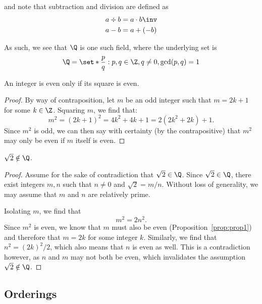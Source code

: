 \documentclass{article}
\begin{document}
and note that subtraction and division are defined as
\begin{align*}
  a \div b &= a \cdot b\inv\\
  a - b &= a + (-b)
\end{align*}

As such, we see that $\Q$ is one such field, where the underlying
set is
\begin{equation}
  \Q = \set*{\dfrac{p}{q} : p, q \in \Z, q \ne 0, \gcd(p, q) = 1}
\end{equation}

\begin{prop}\label{prop:prop1}
 An integer is even only if its square is even.
\end{prop}
\begin{proof}
  By way of contraposition, let $m$ be an odd integer such that
  $m = 2k+1$ for some $k \in \Z$. Squaring $m$, we find that:
  \begin{equation}
    m^{2} = {(2k + 1)}^{2} = 4k^{2} + 4k + 1 = 2(2k^{2} + 2k) + 1.
  \end{equation}
  Since $m^{2}$ is odd, we can then say with certainty (by the contrapositive)
  that $m^{2}$ may only be even if $m$ itself is even.
\end{proof}

\begin{theorem}
  $\sqrt{2} \notin \Q$.
\end{theorem}
\begin{proof}
  Assume for the sake of contradiction that $\sqrt{2} \in \Q$.
  Since $\sqrt{2} \in \Q$, there exist integers $m, n$ such that $n \ne 0$
  and $\sqrt{2} = m/n$. Without loss of generality, we may assume that
  $m$ and $n$ are relatively prime.

  Isolating $m$, we find that
  \begin{equation*}
    m^{2} = 2n^{2}.
  \end{equation*}
  Since $m^{2}$ is even, we know that $m$ must also be even (Proposition~\ref{prop:prop1})
  and therefore that $m = 2k$ for some integer $k$.
  Similarly, we find that $n^{2} = {(2k)}^{2}/2$, which
  also means that $n$ is even as well.
  This is a contradiction however, as $n$ and $m$ may not both be even, which
  invalidates the assumption $\sqrt{2} \notin \Q$.
\end{proof}

\subsection{Orderings}
\end{document}
